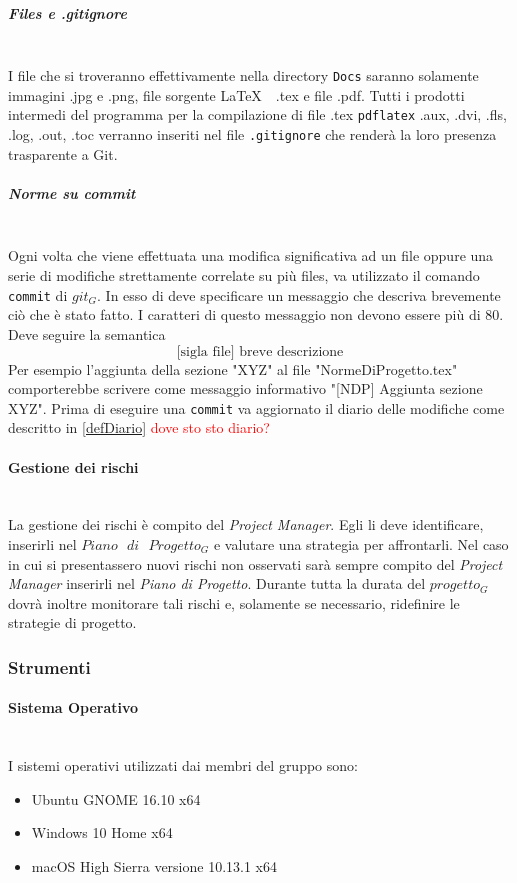 			\subparagraph{Files e .gitignore}\mbox{} \\
			I file che si troveranno effettivamente nella directory \texttt{Docs} saranno solamente immagini .jpg e .png, file sorgente \LaTeX $\text{ }$ .tex e file .pdf. Tutti i prodotti intermedi del programma per la compilazione di file .tex \texttt{pdflatex} .aux, .dvi, .fls, .log, .out, .toc verranno inseriti nel file \texttt{.gitignore} che renderà la loro presenza trasparente a Git.
			
			\subparagraph{Norme su commit}\mbox{} \\
			Ogni volta che viene effettuata una modifica significativa ad un file oppure una serie di modifiche strettamente correlate su più files, va utilizzato il comando \texttt{commit} di $git_G$. In esso di deve specificare un messaggio che descriva brevemente ciò che è stato fatto. I caratteri di questo messaggio non devono essere più di 80. Deve seguire la semantica
			$$\text{[sigla file] breve descrizione}$$
			Per esempio l'aggiunta della sezione "XYZ" al file "NormeDiProgetto.tex" comporterebbe scrivere come messaggio informativo "[NDP] Aggiunta sezione XYZ". Prima di eseguire una \texttt{commit} va aggiornato il diario delle modifiche come descritto in \ref{defDiario} \textcolor{red}{dove sto sto diario?} 
			
		\paragraph{Gestione dei rischi} \mbox{} \\
		La gestione dei rischi è compito del \emph{Project Manager}. Egli li deve identificare, inserirli nel $Piano\text{ }di\text{ }Progetto_G$ e valutare una strategia per affrontarli. Nel caso in cui si presentassero nuovi rischi non osservati sarà sempre compito del \emph{Project Manager} inserirli nel \emph{Piano di Progetto}. Durante tutta la durata del $progetto_G$ dovrà inoltre monitorare tali rischi e, solamente se necessario, ridefinire le strategie di progetto.
		
	\subsubsection{Strumenti}
		\paragraph{Sistema Operativo} \mbox{} \\
		I sistemi operativi utilizzati dai membri del gruppo sono:
		\begin{itemize}
			\item Ubuntu GNOME 16.10 x64
			\item Windows 10 Home x64
			\item macOS High Sierra versione 10.13.1 x64
		\end{itemize}
		
